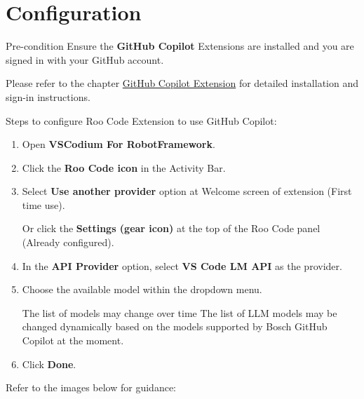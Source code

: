 %
%
%

\section{Configuration}
\begin{boxhint}{Pre-condition}
Ensure the \textbf{GitHub Copilot} Extensions are installed and you are signed
in with your GitHub account.

Please refer to the chapter \hyperref[chap:copilot]{GitHub Copilot Extension}
for detailed installation and sign-in instructions.

\end{boxhint}

Steps to configure Roo Code Extension to use GitHub Copilot:
\begin{enumerate}
   \item Open \textbf{VSCodium For RobotFramework}.
   \item Click the \textbf{Roo Code icon} in the Activity Bar.
   \item Select \textbf{Use another provider} option at Welcome screen of extension (First time use).

         Or click the \textbf{Settings (gear icon)} at the top of the Roo Code panel (Already configured).
   \item In the \textbf{API Provider} option, select \textbf{VS Code LM API}
      as the provider.
   \item Choose the available model within the dropdown menu.
\begin{boxhint}{The list of models may change over time}
The list of LLM models may be changed dynamically based on the models supported
by Bosch GitHub Copilot at the moment.
\end{boxhint}
   \item Click \textbf{Done}.
\end{enumerate}

Refer to the images below for guidance:

